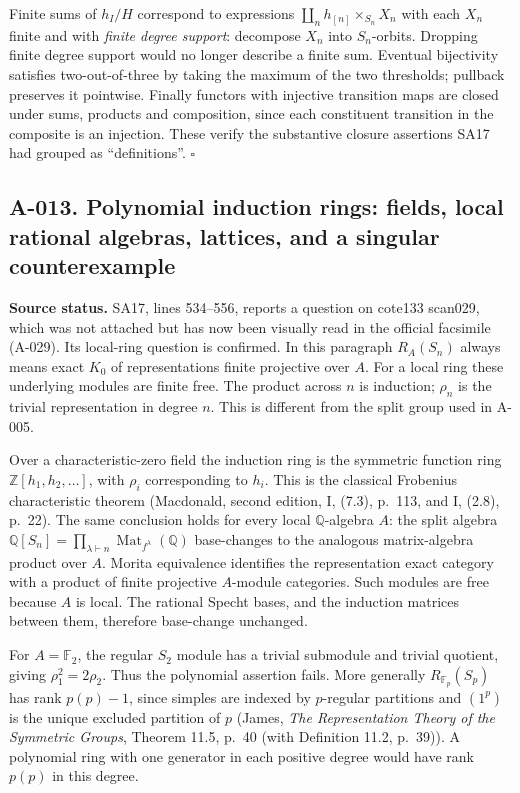 Finite sums of $h_I/H$ correspond to expressions
$\coprod_n h_{[n]}\times_{S_n}X_n$ with each $X_n$ finite and with
\emph{finite degree support}: decompose $X_n$ into $S_n$-orbits.
Dropping finite degree support would no longer describe a finite
sum. Eventual bijectivity satisfies two-out-of-three by taking the
maximum of the two thresholds; pullback preserves it pointwise.
Finally functors with injective transition maps are closed under
sums, products and composition, since each constituent transition
in the composite is an injection. These verify the substantive
closure assertions SA17 had grouped as ``definitions''.
\hfill$\square$


\subsection*{A-013. Polynomial induction rings: fields, local rational algebras, lattices, and a singular counterexample}
\textbf{Source status.} SA17, lines 534--556, reports a question on
cote133 scan029, which was not attached but has now been visually
read in the official facsimile (A-029). Its local-ring question
is confirmed. In this paragraph $R_A(S_n)$
always means exact $K_0$ of representations finite projective over $A$.
For a local ring these underlying modules are finite free. The product
across $n$ is induction; $\rho_n$ is the trivial representation in degree
$n$. This is different from the split group used in A-005.

Over a characteristic-zero field the induction ring is the symmetric
function ring $\mathbb Z[h_1,h_2,\ldots]$, with $\rho_i$ corresponding to
$h_i$. This is the classical Frobenius characteristic theorem (Macdonald, second edition, I, (7.3), p.~113, and I, (2.8), p.~22). The same
conclusion holds for every local $\mathbb Q$-algebra $A$: the split
algebra $\mathbb Q[S_n]=\prod_{\lambda\vdash n}\operatorname{Mat}_{f^\lambda}(\mathbb Q)$
base-changes to the analogous matrix-algebra product over $A$.
Morita equivalence identifies the representation exact category with a
product of finite projective $A$-module categories. Such modules are
free because $A$ is local. The rational Specht bases, and the induction
matrices between them, therefore base-change unchanged.

For $A=\mathbb F_2$, the regular $S_2$ module has a trivial submodule
and trivial quotient, giving $\rho_1^2=2\rho_2$. Thus the polynomial
assertion fails. More generally $R_{\mathbb F_p}(S_p)$ has rank
$p(p)-1$, since simples are indexed by $p$-regular partitions and
$(1^p)$ is the unique excluded partition of $p$ (James, \emph{The
Representation Theory of the Symmetric Groups}, Theorem 11.5, p.~40 (with Definition 11.2, p.~39)). A polynomial ring with one generator in each
positive degree would have rank $p(p)$ in this degree.

